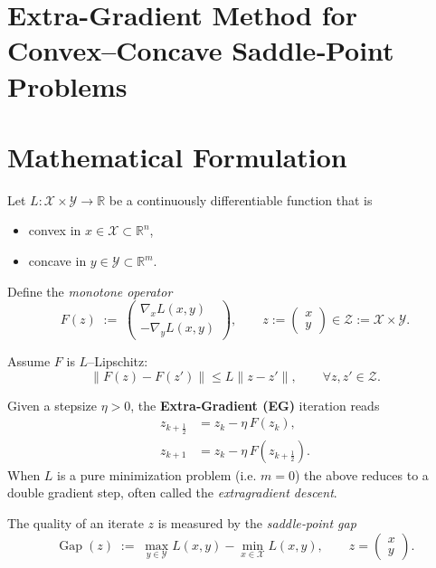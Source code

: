 \documentclass{article}
\newcommand{\gap}{\operatorname{Gap}}
\begin{document}
\section*{Extra-Gradient Method for Convex--Concave Saddle‑Point Problems}

\section*{Mathematical Formulation}
Let $L:\mathcal X\times\mathcal Y\to\mathbb R$ be a continuously differentiable function that is
\begin{itemize}
    \item convex in $x\in\mathcal X\subset\mathbb R^{n}$,
    \item concave in $y\in\mathcal Y\subset\mathbb R^{m}$.
\end{itemize}
Define the \emph{monotone operator}
\[
F(z)\;:=\;
\begin{pmatrix}
\nabla_{x}L(x,y)\\[2mm]
-\nabla_{y}L(x,y)
\end{pmatrix},
\qquad 
z:=\begin{pmatrix}x\\y\end{pmatrix}\in\mathcal Z:=\mathcal X\times\mathcal Y .
\]

Assume $F$ is $L$–Lipschitz:
\[
\|F(z)-F(z')\|\le L\|z-z'\|,\qquad\forall z,z'\in\mathcal Z. \tag{1}
\]

Given a stepsize $\eta>0$, the \textbf{Extra‑Gradient (EG)} iteration reads
\[
\begin{aligned}
z_{k+\frac12} &= z_{k}-\eta\,F(z_{k}), \tag{2a}\\
z_{k+1}       &= z_{k}-\eta\,F\!\left(z_{k+\frac12}\right). \tag{2b}
\end{aligned}
\]
When $L$ is a pure minimization problem (i.e. $m=0$) the above reduces to a double
gradient step, often called the \emph{extragradient descent}.

The quality of an iterate $z$ is measured by the \emph{saddle‑point gap}
\[
\gap(z)\;:=\;
\max_{y\in\mathcal Y}L(x,y)-\min_{x\in\mathcal X}L(x,y), \qquad 
z=\begin{pmatrix}x\\y\end{pmatrix}. \tag{3}
\]
\end{document}
